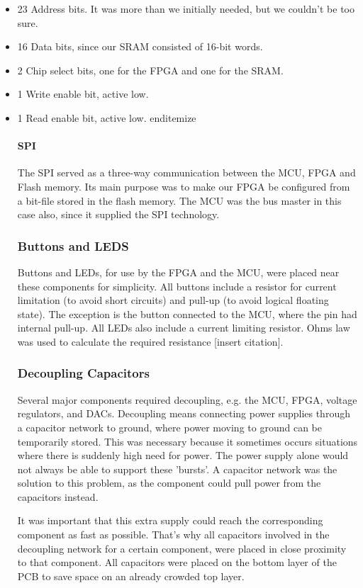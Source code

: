 \begin{itemize}
\item 23 Address bits. It was more than we initially needed, but we couldn't be too sure.
\item 16 Data bits, since our SRAM consisted of 16-bit words.
\item 2 Chip select bits, one for the FPGA and one for the SRAM.
\item 1 Write enable bit, active low.
\item 1 Read enable bit, active low.
end{itemize}

\paragraph{SPI}
The SPI served as a three-way communication between the MCU, FPGA and Flash memory.
Its main purpose was to make our FPGA be configured from a bit-file stored in the flash memory.
The MCU was the bus master in this case also, since it supplied the SPI technology.

\subsubsection{Buttons and LEDS}
Buttons and LEDs, for use by the FPGA and the MCU, were placed near these components for simplicity.
All buttons include a resistor for current limitation (to avoid short circuits) and pull-up (to avoid logical floating state).
The exception is the button connected to the MCU, where the pin had internal pull-up.
All LEDs also include a current limiting resistor.
Ohms law was used to calculate the required resistance [insert citation].

\subsubsection{Decoupling Capacitors}
Several major components required decoupling, e.g. the MCU, FPGA, voltage regulators, and DACs.
Decoupling means connecting power supplies through a capacitor network to ground, where power moving to ground can be temporarily stored.
This was necessary because it sometimes occurs situations where there is suddenly high need for power.
The power supply alone would not always be able to support these 'bursts'.
A capacitor network was the solution to this problem, as the component could pull power from the capacitors instead.

It was important that this extra supply could reach the corresponding component as fast as possible.
That's why all capacitors involved in the decoupling network for a certain component, were placed in close proximity to that component.
All capacitors were placed on the bottom layer of the PCB to save space on an already crowded top layer.


\end{itemize}
